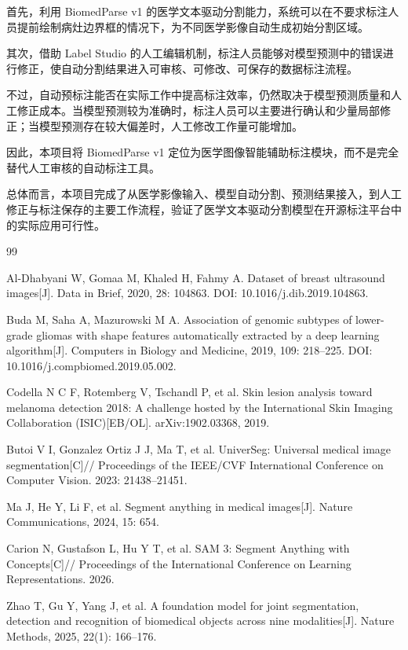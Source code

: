 \documentclass[10.5pt,compsoc]{CjC}
\theoremstyle{mystyle}
\begin{document}
首先，利用 BiomedParse v1 的医学文本驱动分割能力，系统可以在不要求标注人员提前绘制病灶边界框的情况下，为不同医学影像自动生成初始分割区域。

其次，借助 Label Studio 的人工编辑机制，标注人员能够对模型预测中的错误进行修正，使自动分割结果进入可审核、可修改、可保存的数据标注流程。

不过，自动预标注能否在实际工作中提高标注效率，仍然取决于模型预测质量和人工修正成本。当模型预测较为准确时，标注人员可以主要进行确认和少量局部修正；当模型预测存在较大偏差时，人工修改工作量可能增加。

因此，本项目将 BiomedParse v1 定位为医学图像智能辅助标注模块，而不是完全替代人工审核的自动标注工具。

总体而言，本项目完成了从医学影像输入、模型自动分割、预测结果接入，到人工修正与标注保存的主要工作流程，验证了医学文本驱动分割模型在开源标注平台中的实际应用可行性。





\renewcommand{\refname}{\centering 参~考~文~献}

\begin{thebibliography}{99}
\addtolength{\itemsep}{-1em}
\vspace{1.5mm}

Al-Dhabyani W, Gomaa M, Khaled H, Fahmy A.
Dataset of breast ultrasound images[J].
Data in Brief, 2020, 28: 104863.
DOI: 10.1016/j.dib.2019.104863.

Buda M, Saha A, Mazurowski M A.
Association of genomic subtypes of lower-grade gliomas
with shape features automatically extracted by a
deep learning algorithm[J].
Computers in Biology and Medicine, 2019, 109: 218--225.
DOI: 10.1016/j.compbiomed.2019.05.002.

Codella N C F, Rotemberg V, Tschandl P, et al.
Skin lesion analysis toward melanoma detection 2018:
A challenge hosted by the International Skin Imaging
Collaboration (ISIC)[EB/OL].
arXiv:1902.03368, 2019.


Butoi V I, Gonzalez Ortiz J J, Ma T, et al.
UniverSeg: Universal medical image segmentation[C]//
Proceedings of the IEEE/CVF International Conference
on Computer Vision.
2023: 21438--21451.

Ma J, He Y, Li F, et al.
Segment anything in medical images[J].
Nature Communications, 2024, 15: 654.

Carion N, Gustafson L, Hu Y T, et al.
SAM 3: Segment Anything with Concepts[C]//
Proceedings of the International Conference
on Learning Representations.
2026.

Zhao T, Gu Y, Yang J, et al.
A foundation model for joint segmentation, detection
and recognition of biomedical objects across nine
modalities[J].
Nature Methods, 2025, 22(1): 166--176.



\end{thebibliography}




 
\end{document}
